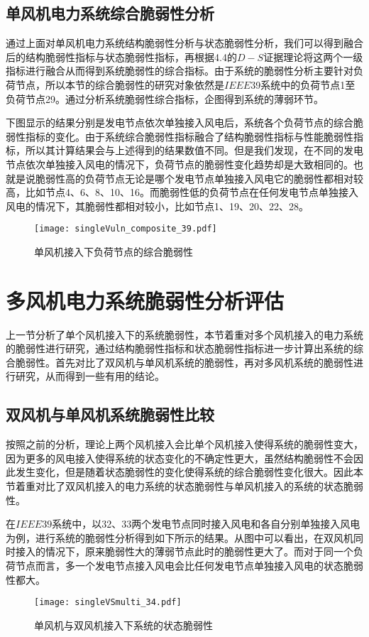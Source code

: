 \subsection{单风机电力系统综合脆弱性分析}
\label{sec:singleAnalysis}
通过上面对单风机电力系统结构脆弱性分析与状态脆弱性分析，我们可以得到融合后的结构脆弱性指标与状态脆弱性指标，再根据4.4的$D-S$证据理论将这两个一级指标进行融合从而得到系统脆弱性的综合指标。由于系统的脆弱性分析主要针对负荷节点，所以本节的综合脆弱性的研究对象依然是$IEEE$39系统中的负荷节点1至负荷节点29。通过分析系统脆弱性综合指标，企图得到系统的薄弱环节。

下图显示的结果分别是发电节点依次单独接入风电后，系统各个负荷节点的综合脆弱性指标的变化。由于系统综合脆弱性指标融合了结构脆弱性指标与性能脆弱性指标，所以其计算结果会与上述得到的结果数值不同。但是我们发现，在不同的发电节点依次单独接入风电的情况下，负荷节点的脆弱性变化趋势却是大致相同的。也就是说脆弱性高的负荷节点无论是哪个发电节点单独接入风电它的脆弱性都相对较高，比如节点4、6、8、10、16。而脆弱性低的负荷节点在任何发电节点单独接入风电的情况下，其脆弱性都相对较小，比如节点1、19、20、22、28。
\begin{figure}[H] %
  \centering
  \texttt{[image: singleVuln\_composite\_39.pdf]}
  \caption{单风机接入下负荷节点的综合脆弱性}
  \label{fig:singleVuln_composite_39}
\end{figure}

\section{多风机电力系统脆弱性分析评估}
\label{sec:multiAssessment}
上一节分析了单个风机接入下的系统脆弱性，本节着重对多个风机接入的电力系统的脆弱性进行研究，通过结构脆弱性指标和状态脆弱性指标进一步计算出系统的综合脆弱性。首先对比了双风机与单风机系统的脆弱性，再对多风机系统的脆弱性进行研究，从而得到一些有用的结论。

\subsection{双风机与单风机系统脆弱性比较}
\label{sec:multiVSsingle}
按照之前的分析，理论上两个风机接入会比单个风机接入使得系统的脆弱性变大，因为更多的风电接入使得系统的状态变化的不确定性更大，虽然结构脆弱性不会因此发生变化，但是随着状态脆弱性的变化使得系统的综合脆弱性变化很大。因此本节着重对比了双风机接入的电力系统的状态脆弱性与单风机接入的系统的状态脆弱性。

在$IEEE39$系统中，以32、33两个发电节点同时接入风电和各自分别单独接入风电为例，进行系统的脆弱性分析得到如下所示的结果。从图中可以看出，在双风机同时接入的情况下，原来脆弱性大的薄弱节点此时的脆弱性更大了。而对于同一个负荷节点而言，多一个发电节点接入风电会比任何发电节点单独接入风电的状态脆弱性都大。
\begin{figure}[H] %
  \centering
  \texttt{[image: singleVSmulti\_34.pdf]}
  \caption{单风机与双风机接入下系统的状态脆弱性}
  \label{fig:singleVSmulti_34}
\end{figure}

